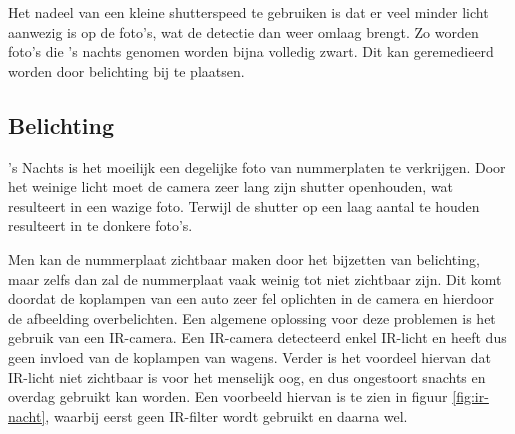 Het nadeel van een kleine shutterspeed te gebruiken is dat er veel minder licht aanwezig is op de foto's, wat de detectie dan weer omlaag brengt. Zo worden foto's die 's nachts genomen worden bijna volledig zwart. Dit kan geremedieerd worden door belichting bij te plaatsen.

\subsection{Belichting}
's Nachts is het moeilijk een degelijke foto van nummerplaten te verkrijgen. Door het weinige licht moet de camera zeer lang zijn shutter openhouden, wat resulteert in een wazige foto. Terwijl de shutter op een laag aantal te houden resulteert in te donkere foto's.

Men kan de nummerplaat zichtbaar maken door het bijzetten van belichting, maar zelfs dan zal de nummerplaat vaak weinig tot niet zichtbaar zijn. Dit komt doordat de koplampen van een auto zeer fel oplichten in de camera en hierdoor de afbeelding overbelichten. Een algemene oplossing voor deze problemen is het gebruik van een IR-camera. Een IR-camera detecteerd enkel IR-licht en heeft dus geen invloed van de koplampen van wagens. Verder is het voordeel hiervan dat IR-licht niet zichtbaar is voor het menselijk oog, en dus ongestoort snachts en overdag gebruikt kan worden. Een voorbeeld hiervan is te zien in figuur \ref{fig:ir-nacht}, waarbij eerst geen IR-filter wordt gebruikt en daarna wel.

